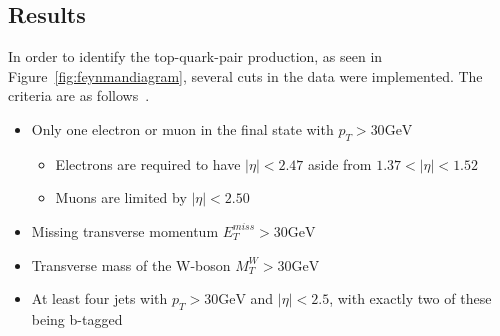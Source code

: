 \documentclass[12pt,a4paper]{article}
\numberwithin{equation}{section}
\begin{document}
\subsection{Results}\label{sec:results}
In order to identify the top-quark-pair production, as seen in
Figure~\ref{fig:feynmandiagram}, several cuts in the data were implemented. The
criteria are as follows~\cite{oreach2020}.
\begin{itemize}
  \item Only one electron or muon in the final state with $p_{T} > 30 \mathrm{GeV}$
  \begin{itemize}
    \item Electrons are required to have $|\eta| < 2.47$ aside from $1.37 < |\eta| < 1.52$
    \item Muons are limited by $|\eta| < 2.50$
  \end{itemize}
  \item Missing transverse momentum $E_{T}^{miss} > 30 \mathrm{GeV}$
  \item Transverse mass of the W-boson $M_{T}^{W} > 30 \mathrm{GeV}$
  \item At least four jets with $p_{T} > 30 \mathrm{GeV}$ and $|\eta| < 2.5$, with
        exactly two of these being b-tagged
\end{itemize}

\end{document}
